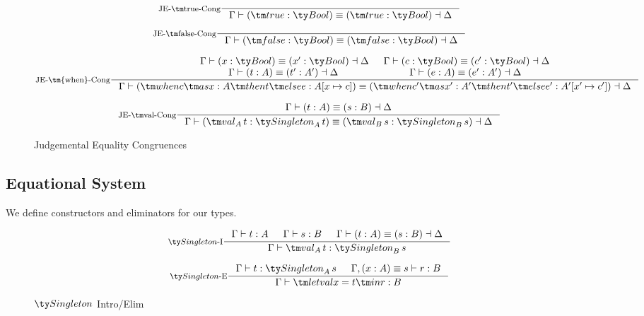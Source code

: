 \begin{figure*}[h]
  \[
    \inference[JE-\true-Cong]{}
                    {\Gamma \vdash (\true : \Bool) \equiv (\true : \Bool) \dashv \Delta}
  \]
  \[
    \inference[JE-\false-Cong]{}
                    {\Gamma \vdash (\false : \Bool) \equiv (\false : \Bool) \dashv \Delta}
  \]

  \[
  \inference[JE-\tm{when}-Cong]
            { \Gamma \vdash (x : \Bool) \equiv (x' : \Bool) \dashv \Delta
            & \Gamma \vdash (c : \Bool) \equiv (c' : \Bool) \dashv \Delta
            \\ \Gamma \vdash (t : A) \equiv (t' : A') \dashv \Delta
            & \Gamma \vdash (e : A) \equiv (e' : A') \dashv \Delta
            }
            {\Gamma \vdash (\when c x A t e : A[x \mapsto c])
            \\ \equiv (\when{c'}{x'}{A'}{t'}{e'} : A'[x' \mapsto c']) \dashv \Delta}
  \]

  \[
    \inference[JE-\val-Cong]{\Gamma \vdash (t : A) \equiv (s : B) \dashv \Delta}
                     {\Gamma \vdash (\val[A][t] : \Singleton[A][t]) \equiv (\val[B][s] : \Singleton[B][s]) \dashv \Delta}
  \]

  \caption*{Judgemental Equality Congruences}
  \label{fig:dt-singletons-je-cong}
\end{figure*}

\subsection{Equational System}
We define constructors and eliminators for our types.

\begin{figure*}[h]
  \[
  \inference[\Intro{$\Singleton$}]
            { \Gamma \vdash t : A
            & \Gamma \vdash s : B
            & \Gamma \vdash (t : A) \equiv (s : B) \dashv \Delta
            }
            {\Gamma \vdash \val[A][t] : \Singleton[B][s]}
  \]

  \[
  \inference[\Elim{$\Singleton$}]
            {\Gamma \vdash t : \Singleton[A][s]
            & \Gamma, (x : A) \equiv s \vdash r : B}
            {\Gamma \vdash \letval x t r : B}
  \]

  \caption*{$\Singleton$ Intro/Elim}
  \label{fig:dt-singletons-singleton-intro-elim}
\end{figure*}

